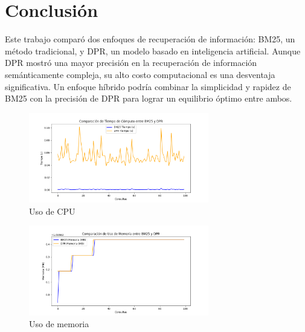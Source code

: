 \documentclass[runningheads]{llncs}
\begin{document}
\section{Conclusión}
Este trabajo comparó dos enfoques de recuperación de información: BM25, un método tradicional, y DPR, un modelo basado en inteligencia artificial. Aunque DPR mostró una mayor precisión en la recuperación de información semánticamente compleja, su alto costo computacional es una desventaja significativa. Un enfoque híbrido podría combinar la simplicidad y rapidez de BM25 con la precisión de DPR para lograr un equilibrio óptimo entre ambos.

\begin{figure}[h!]
    \centering
    \includegraphics[width=0.7\textwidth]
    {img/tiempo_computo_comparacion.png}
    \caption{Uso de CPU}
    \label{fig:bm25_cpu_memory}
\end{figure}

\begin{figure}[h!]
    \centering
    \includegraphics[width=0.7\textwidth]{img/uso_memoria_comparacion.png}
    \caption{Uso de memoria}
    \label{fig:dpr_cpu_memory}
\end{figure}
\end{document}
